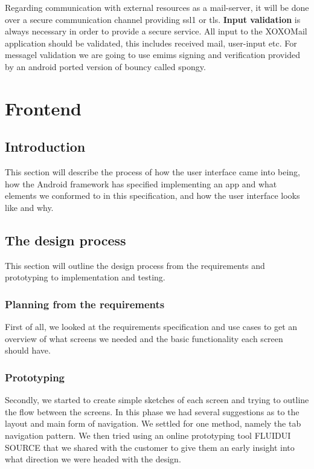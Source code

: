 Regarding communication with external resources as a mail-server, it will be done over a secure communication channel providing \gls{ssl1} or \gls{tls}. 
\newline
\newline
\textbf{Input validation} is always necessary in order to provide a secure service. All input to the XOXOMail application should be validated, this includes received mail, user-input etc. For messagel validation we are going to use \gls{emims} signing and verification provided by an android ported version of \gls{bouncy} called \gls{spongy}.





\section{Frontend}

\subsection{Introduction}
This section will describe the process of how the user interface came into being, how the Android framework has specified implementing an app and what elements we conformed to in this specification, and how the user interface looks like and why.

\subsection{The design process}
This section will outline the design process from the requirements and prototyping to implementation and testing.

\subsubsection{Planning from the requirements}
First of all, we looked at the requirements specification and use cases to get an overview of what screens we needed and the basic functionality each screen should have. 

\subsubsection{Prototyping}
Secondly, we started to create simple sketches of each screen and trying to outline the flow between the screens. In this phase we had several suggestions as to the layout and main form of navigation. We settled for one method, namely the tab navigation pattern. We then tried using an online prototyping tool FLUIDUI SOURCE that we shared with the customer to give them an early insight into what direction we were headed with the design. 

